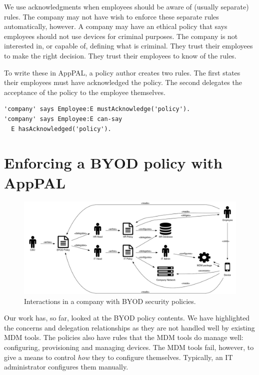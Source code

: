 \documentclass[thesis.tex]{subfiles}
\begin{document}
We use acknowledgments when employees should be aware of (usually separate) rules.
The company may not have wish to enforce these separate rules automatically, however.
A company may have an ethical policy that says employees should not use devices for criminal purposes.
The company is not interested in, or capable of, defining what is criminal.
They trust their employees to make the right decision.
They trust their employees to know of the rules.

To write these in AppPAL, a policy author creates two rules.
  The first states their employees must have acknowledged the policy.
  The second delegates the acceptance of the policy to the employee themselves.
\begin{lstlisting}
'company' says Employee:E mustAcknowledge('policy').
'company' says Employee:E can-say
  E hasAcknowledged('policy').
\end{lstlisting}


\section{Enforcing a BYOD policy with AppPAL}

\begin{figure}
  \centering
  \includegraphics[width=\textwidth]{figures/mdm-overview.pdf}
  \caption{Interactions in a company with BYOD security policies.}
  \label{fig:mdm-overview}
\end{figure}

Our work has, so far, looked at the BYOD policy contents. We have highlighted
the concerns and delegation relationships as they are not handled well by
existing \ac{MDM} tools. The policies also have rules that the \ac{MDM} tools do
manage well: configuring, provisioning and managing devices. The \ac{MDM} tools
fail, however, to give a means to control \emph{how} they to configure
themselves. Typically, an IT administrator configures them manually.
\end{document}
